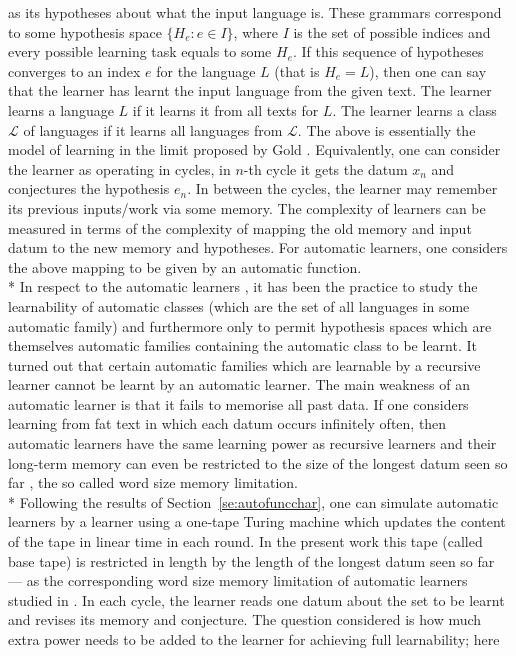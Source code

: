 \documentclass{LMCS}
\newcommand{\CalL}{{\mathcal L}}
\theoremstyle{plain}\newtheorem{athm}[thm]{Theorem}
\theoremstyle{plain}\newtheorem{aprop}[thm]{Proposition}
\theoremstyle{plain}\newtheorem{aprob}[thm]{Open Problem}
\theoremstyle{plain}\newtheorem{acor}[thm]{Corollary}
\theoremstyle{plain}\newtheorem{alem}[thm]{Lemma}
\theoremstyle{definition}\newtheorem{adefn}[thm]{Definition}
\theoremstyle{definition}\newtheorem{arem}[thm]{Remark}
\theoremstyle{plain}\newtheorem{aexmp}[thm]{Example}
\theoremstyle{plain}\newtheorem{aclm}[thm]{Claim}
\def\sp{\\*\indent}
\begin{document}
as its hypotheses about what the input language is.
These grammars correspond to some hypothesis space $\{H_e: e \in I\}$,
where $I$ is the set of possible indices and every possible learning
task equals to some $H_e$.
If this sequence of hypotheses converges to an index $e$ for the language $L$
(that is $H_e=L$),
then one can say that the learner has learnt the input language from
the given text. The learner learns a language $L$ if it learns it from all
texts for $L$. The learner learns a class $\CalL$ of languages if it learns
all languages from $\CalL$.
The above is essentially the model of learning in the limit proposed
by Gold \cite{Go67}. Equivalently, one can consider the learner as
operating in cycles, in $n$-th cycle it gets the datum $x_n$ and
conjectures the hypothesis $e_n$. In between the cycles, the learner
may remember its previous inputs/work via some memory. The
complexity of learners can be measured in terms of the complexity of
mapping the old memory and input datum to the new memory and hypotheses.
For automatic learners, one considers the above mapping to be given by
an automatic function.
\sp
In respect to the automatic learners
\cite{CJLOSS11,JLS09,JOPS10}, it has been the practice to study the
learnability of automatic classes (which are the set of all languages
in some automatic family) and furthermore only to permit hypothesis
spaces which are themselves automatic families containing the automatic
class to be learnt. It turned
out that certain automatic families which are learnable by a recursive
learner cannot be learnt by an automatic learner. The main weakness
of an automatic learner is that it fails to memorise all past data.
If one considers learning from fat text in which each datum occurs
infinitely often, then automatic learners have the same learning
power as recursive learners and their long-term memory can even
be restricted to the size of the longest datum seen so far \cite{JLS09},
the so called word size memory limitation.
\sp
Following the results of Section~\ref{se:autofuncchar},
one can simulate automatic learners by a learner using a one-tape Turing
machine which updates the content of the tape in linear time in
each round. In the present work this tape (called base tape)
is restricted in length by the length
of the longest datum seen so far --- as the corresponding word size
memory limitation of automatic learners studied in \cite{JLS09}. 
In each cycle, the
learner reads one datum about the set to be learnt and revises its
memory and conjecture. The question considered is how much extra power 
needs to be added to the learner for achieving full learnability; here
\end{document}
